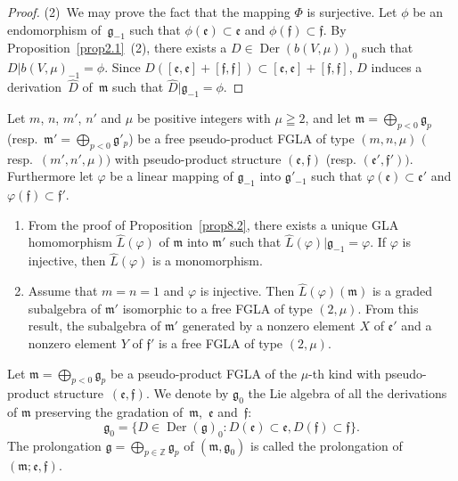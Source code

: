 \documentclass[pdftex]{sigma}
\numberwithin{equation}{section}
\numberwithin{theorem}{section}
\numberwithin{proposition}{section}
\numberwithin{lemma}{section}
\numberwithin{corollary}{section}
\numberwithin{definition}{section}
\numberwithin{example}{section}
\numberwithin{remark}{section}
\numberwithin{note}{section}
\newcommand{\Der}{\operatorname{Der}}
\newcommand{\gla}[1]{\mathfrak#1=\bigoplus\limits_{p\in\mathbb Z}\mathfrak#1_p} \renewcommand{\labelenumi}{{\rm (\arabic{enumi})}}
\begin{document}
\begin{proof}
(2)~We may prove the fact that the mapping $\Phi$ is surjective.
Let $\phi$ be an endomorphism of~$\mathfrak g_{-1}$ such that
$\phi(\mathfrak e)\subset \mathfrak e$ and
$\phi(\mathfrak f)\subset \mathfrak f$.
By Proposition~\ref{prop2.1}~(2), there exists a $D\in\Der(b(V,\mu))_0$
such that $D|b(V,\mu)_{-1}=\phi$.
Since $D([\mathfrak e,\mathfrak e]+[\mathfrak f,\mathfrak f])
\subset [\mathfrak e,\mathfrak e]+[\mathfrak f,\mathfrak f]$,
$D$ induces a derivation~$\hat{D}$ of~$\mathfrak m$ such that
$\hat{D}|\mathfrak g_{-1}=\phi$.
\end{proof}

\begin{remark}\label{rem8.1}
Let $m$, $n$, $m'$, $n'$ and $\mu$ be positive integers with $\mu\geqq2$, and let
$\mathfrak m=\bigoplus\limits_{p<0}\mathfrak g_p$
(resp.\ $\mathfrak m'=\bigoplus\limits_{p<0}\mathfrak g'_p$) be a
free pseudo-product FGLA of type $(m,n,\mu)$ $($resp.~$(m',n',\mu))$
with pseudo-product structure $(\mathfrak e,\mathfrak f)$
(resp. $(\mathfrak e',\mathfrak f'))$.
Furthermore
let $\varphi$ be a linear mapping of $\mathfrak g_{-1}$ into
$\mathfrak g'_{-1}$ such that $\varphi(\mathfrak e)\subset \mathfrak e'$ and
$\varphi(\mathfrak f)\subset \mathfrak f'$.
\begin{enumerate}\itemsep=0pt
\item
From the proof of Proposition~\ref{prop8.2}, there exists a unique GLA
homomorphism $\hat{L}(\varphi)$ of $\mathfrak m$ into $\mathfrak m'$
such that $\hat{L}(\varphi)|\mathfrak g_{-1}=\varphi$.
If $\varphi$ is injective, then $\hat{L}(\varphi)$ is a monomorphism.
\item
Assume that $m=n=1$ and $\varphi$ is injective.
Then $\hat{L}(\varphi)(\mathfrak m)$ is a graded subalgebra of $\mathfrak m'$
isomorphic to a free FGLA of type $(2,\mu)$.
From this result,
the subalgebra of $\mathfrak m'$ generated by a nonzero element $X$ of
$\mathfrak e'$ and a nonzero element $Y$ of $\mathfrak f'$
is a free FGLA of type $(2,\mu)$.
\end{enumerate}
\end{remark}

Let $\mathfrak m=\bigoplus\limits_{p<0}\mathfrak g_p$ be a pseudo-product FGLA
of the $\mu$-th kind with pseudo-product structure~$(\mathfrak e,\mathfrak f)$.
We denote by $\mathfrak g_0$ the Lie algebra of
all the derivations of $\mathfrak m$ preserving the gradation of~$\mathfrak m$,~$\mathfrak e$ and~$\mathfrak f$:
\[
\mathfrak g_0=\{ D\in\Der(\mathfrak g)_0:D(\mathfrak e)\subset \mathfrak e,
D(\mathfrak f)\subset \mathfrak f \}.
\]
The prolongation
$\gla g$ of $(\mathfrak m,\mathfrak g_0)$ is called the prolongation of
$(\mathfrak m;\mathfrak e,\mathfrak f)$.
\end{document}
